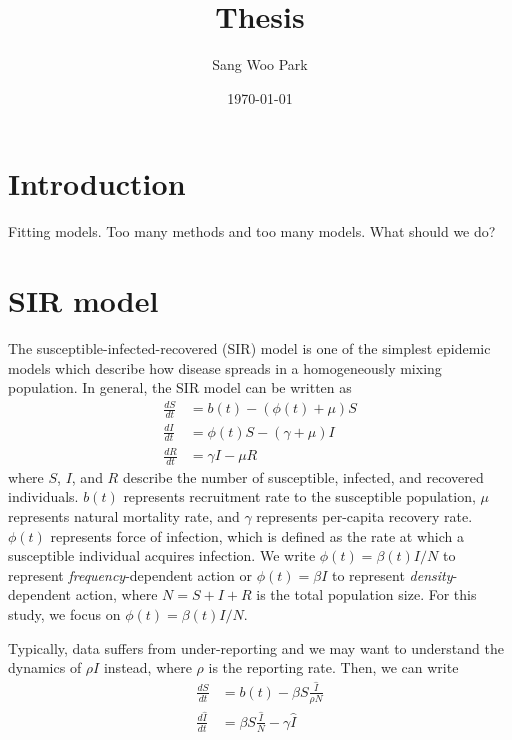 \documentclass{article}
\title{Thesis}
\date{\today}
\author{Sang Woo Park}
\begin{document}
\maketitle


\section{Introduction}

Fitting models. Too many methods and too many models. What should we do?

\section{SIR model}

The susceptible-infected-recovered (SIR) model is one of the simplest epidemic models which describe how disease spreads in a homogeneously mixing population.
In general, the SIR model can be written as 
\begin{equation}
\begin{aligned}
\frac{dS}{dt} &= b(t) - (\phi(t) + \mu) S\\
\frac{dI}{dt} &= \phi(t) S - (\gamma + \mu) I\\
\frac{dR}{dt} &= \gamma I - \mu R
\end{aligned}
\label{eq:sir}
\end{equation}
where $S$, $I$, and $R$ describe the number of susceptible, infected, and recovered individuals.
$b(t)$ represents recruitment rate to the susceptible population, $\mu$ represents natural mortality rate, and $\gamma$ represents per-capita recovery rate.
$\phi(t)$ represents force of infection, which is defined as the rate at which a susceptible individual acquires infection.
We write $\phi(t) = \beta(t) I/N$ to represent \textit{frequency}-dependent action or $\phi(t) = \beta I$ to represent \textit{density}-dependent action, where $N = S + I + R$ is the total population size.
For this study, we focus on $\phi(t) = \beta(t)I/N$.

Typically, data suffers from under-reporting and we may want to understand the dynamics of $\rho I$ instead, where $\rho$ is the reporting rate.
Then, we can write
\begin{equation}
\begin{aligned}
\frac{dS}{dt} &= b(t) - \beta S \frac{\hat{I}}{\rho N} \\
\frac{d\hat{I}}{dt} &= \beta S \frac{\hat{I}}{N} - \gamma \hat{I} \\
\end{aligned}
\label{eq:rhosir}
\end{equation}
\end{document}
